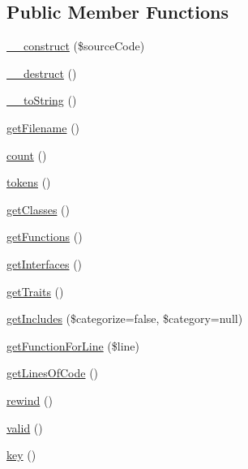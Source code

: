 \subsection*{Public Member Functions}
\begin{DoxyCompactItemize}
\item 
\mbox{\hyperlink{class_p_h_p___token___stream_ade8c7bd95df12ab7a2fe01fc40d99b1a}{\+\_\+\+\_\+construct}} (\$source\+Code)
\item 
\mbox{\hyperlink{class_p_h_p___token___stream_a421831a265621325e1fdd19aace0c758}{\+\_\+\+\_\+destruct}} ()
\item 
\mbox{\hyperlink{class_p_h_p___token___stream_a7516ca30af0db3cdbf9a7739b48ce91d}{\+\_\+\+\_\+to\+String}} ()
\item 
\mbox{\hyperlink{class_p_h_p___token___stream_a2982abe8d7b767602a1485dfb4cf653d}{get\+Filename}} ()
\item 
\mbox{\hyperlink{class_p_h_p___token___stream_ac751e87b3d4c4bf2feb03bee8b092755}{count}} ()
\item 
\mbox{\hyperlink{class_p_h_p___token___stream_a99ba83c859a4515678355aec2f4c4f6b}{tokens}} ()
\item 
\mbox{\hyperlink{class_p_h_p___token___stream_aaab663f8e00e05d4f6853d580e231e14}{get\+Classes}} ()
\item 
\mbox{\hyperlink{class_p_h_p___token___stream_a131c2522f07821f77cd1d038c216031b}{get\+Functions}} ()
\item 
\mbox{\hyperlink{class_p_h_p___token___stream_aacd41ad982fee4953d8ad245ab7e4ec9}{get\+Interfaces}} ()
\item 
\mbox{\hyperlink{class_p_h_p___token___stream_a8985442e8133cd567bf7ce548f96561f}{get\+Traits}} ()
\item 
\mbox{\hyperlink{class_p_h_p___token___stream_a18ca2d328c9cf2566e419fcfc609f979}{get\+Includes}} (\$categorize=false, \$category=null)
\item 
\mbox{\hyperlink{class_p_h_p___token___stream_ac6b487ff48b29eab308aac9ab0f7ac0f}{get\+Function\+For\+Line}} (\$line)
\item 
\mbox{\hyperlink{class_p_h_p___token___stream_a078d4af993fd559bc026b82d6d324ca3}{get\+Lines\+Of\+Code}} ()
\item 
\mbox{\hyperlink{class_p_h_p___token___stream_ae619dcf2218c21549cb65d875bbc6c9c}{rewind}} ()
\item 
\mbox{\hyperlink{class_p_h_p___token___stream_abb9f0d6adf1eb9b3b55712056861a247}{valid}} ()
\item 
\mbox{\hyperlink{class_p_h_p___token___stream_a729e946b4ef600e71740113c6d4332c0}{key}} ()

\end{DoxyCompactItemize}
